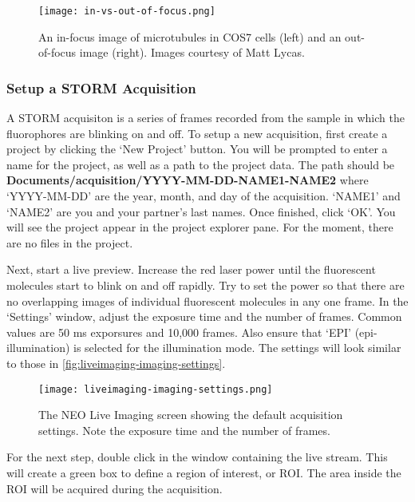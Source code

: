 \documentclass[10pt,a4paper,oneside]{book}
\begin{document}
\begin{figure}[ht]
    \centering
    \texttt{[image: in-vs-out-of-focus.png]}
    \caption{An in-focus image of microtubules in COS7 cells (left) and an out-of-focus image (right). Images courtesy of Matt Lycas.}
    \label{fig:in-vs-out-of-focus}
\end{figure}

\subsubsection{Setup a STORM Acquisition}

A STORM acquisiton is a series of frames recorded from the sample in which the fluorophores are blinking on and off. To setup a new acquisition, first create a project by clicking the `New Project' button. You will be prompted to enter a name for the project, as well as a path to the project data. The path should be \textbf{Documents/acquisition/YYYY-MM-DD-NAME1-NAME2} where `YYYY-MM-DD' are the year, month, and day of the acquisition. `NAME1' and `NAME2' are you and your partner's last names. Once finished, click `OK'. You will see the project appear in the project explorer pane. For the moment, there are no files in the project.

Next, start a live preview. Increase the red laser power until the fluorescent molecules start to blink on and off rapidly. Try to set the power so that there are no overlapping images of individual fluorescent molecules in any one frame. In the `Settings' window, adjust the exposure time and the number of frames. Common values are 50 ms exporsures and 10,000 frames. Also ensure that `EPI' (epi-illumination) is selected for the illumination mode. The settings will look similar to those in \autoref{fig:liveimaging-imaging-settings}.

\begin{figure}[ht]
    \centering
    \texttt{[image: liveimaging-imaging-settings.png]}
    \caption{The NEO Live Imaging screen showing the default acquisition settings. Note the exposure time and the number of frames.}
    \label{fig:liveimaging-imaging-settings}
\end{figure}

For the next step, double click in the window containing the live stream. This will create a green box to define a region of interest, or ROI. The area inside the ROI will be acquired during the acquisition.

\newline
\end{document}
